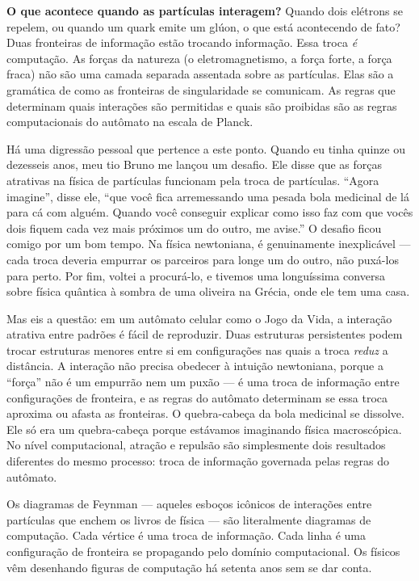 \documentclass[11pt, twoside, openright]{book}
\begin{document}
\textbf{O que acontece quando as partículas interagem?} Quando dois elétrons se repelem, ou quando um quark emite um glúon, o que está acontecendo de fato? Duas fronteiras de informação estão trocando informação. Essa troca \textit{é} computação. As forças da natureza (o eletromagnetismo, a força forte, a força fraca) não são uma camada separada assentada sobre as partículas. Elas são a gramática de como as fronteiras de singularidade se comunicam. As regras que determinam quais interações são permitidas e quais são proibidas são as regras computacionais do autômato na escala de Planck.

Há uma digressão pessoal que pertence a este ponto. Quando eu tinha quinze ou dezesseis anos, meu tio Bruno me lançou um desafio. Ele disse que as forças atrativas na física de partículas funcionam pela troca de partículas. ``Agora imagine'', disse ele, ``que você fica arremessando uma pesada bola medicinal de lá para cá com alguém. Quando você conseguir explicar como isso faz com que vocês dois fiquem cada vez mais próximos um do outro, me avise.'' O desafio ficou comigo por um bom tempo. Na física newtoniana, é genuinamente inexplicável --- cada troca deveria empurrar os parceiros para longe um do outro, não puxá-los para perto. Por fim, voltei a procurá-lo, e tivemos uma longuíssima conversa sobre física quântica à sombra de uma oliveira na Grécia, onde ele tem uma casa.

Mas eis a questão: em um autômato celular como o Jogo da Vida, a interação atrativa entre padrões é fácil de reproduzir. Duas estruturas persistentes podem trocar estruturas menores entre si em configurações nas quais a troca \textit{reduz} a distância. A interação não precisa obedecer à intuição newtoniana, porque a ``força'' não é um empurrão nem um puxão --- é uma troca de informação entre configurações de fronteira, e as regras do autômato determinam se essa troca aproxima ou afasta as fronteiras. O quebra-cabeça da bola medicinal se dissolve. Ele só era um quebra-cabeça porque estávamos imaginando física macroscópica. No nível computacional, atração e repulsão são simplesmente dois resultados diferentes do mesmo processo: troca de informação governada pelas regras do autômato.

Os diagramas de Feynman --- aqueles esboços icônicos de interações entre partículas que enchem os livros de física --- são literalmente diagramas de computação. Cada vértice é uma troca de informação. Cada linha é uma configuração de fronteira se propagando pelo domínio computacional. Os físicos vêm desenhando figuras de computação há setenta anos sem se dar conta.
\end{document}
